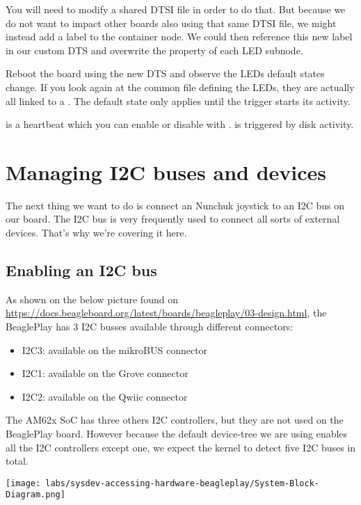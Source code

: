 You will need to modify a shared DTSI file in order to do that. But
because we do not want to impact other boards also using that same DTSI
file, we might instead add a label to the  container node. We
could then reference this new label in our custom DTS and overwrite the
 property of each LED subnode.

Reboot the board using the new DTS and observe the LEDs default states change.
If you look again at the common file defining the LEDs, they are actually all
linked to a . The default state only applies until
the trigger starts its activity.

 is a heartbeat which you can enable or disable with
.  is triggered by disk
activity.

\section{Managing I2C buses and devices}

The next thing we want to do is connect an Nunchuk joystick
to an I2C bus on our board. The I2C bus is very frequently used
to connect all sorts of external devices. That's why we're covering
it here.

\subsection{Enabling an I2C bus}

As shown on the below picture found on
\url{https://docs.beagleboard.org/latest/boards/beagleplay/03-design.html}, the
BeaglePlay has 3 I2C busses available through different connectors:

\begin{itemize}
\item I2C3: available on the mikroBUS connector
\item I2C1: available on the Grove connector
\item I2C2: available on the Qwiic connector
\end{itemize}

The AM62x SoC has three others I2C controllers, but they are not used on the
BeaglePlay board. However because the default device-tree we are using enables
all the I2C controllers except one, we expect the kernel to detect five I2C
buses in total.

\texttt{[image: labs/sysdev-accessing-hardware-beagleplay/System-Block-Diagram.png]}

